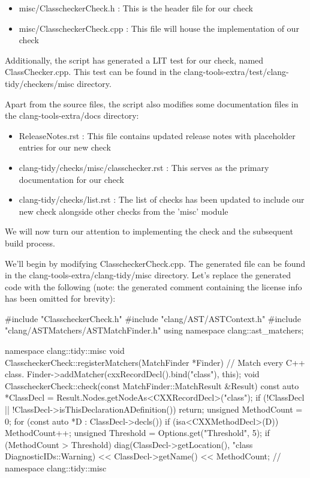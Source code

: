 \begin{itemize}
\item
misc/ClasscheckerCheck.h : This is the header file for our check

\item
misc/ClasscheckerCheck.cpp : This file will house the implementation of our check
\end{itemize}

Additionally, the script has generated a LIT test for our check, named ClassChecker.cpp. This test can be found in the clang-tools-extra/test/clang-tidy/checkers/misc directory.

Apart from the source files, the script also modifies some documentation files in the clang-tools-extra/docs directory:

\begin{itemize}
\item
ReleaseNotes.rst : This file contains updated release notes with placeholder entries for our new check

\item
clang-tidy/checks/misc/classchecker.rst : This serves as the primary documentation for our check

\item
clang-tidy/checks/list.rst : The list of checks has been updated to include our new check alongside other checks from the 'misc' module
\end{itemize}

We will now turn our attention to implementing the check and the subsequent build process.


We'll begin by modifying ClasscheckerCheck.cpp. The generated file can be found in the clang-tools-extra/clang-tidy/misc directory. Let's replace the generated code with the following (note: the generated comment containing the license info has been omitted for brevity):

\begin{cpp}
#include "ClasscheckerCheck.h"
#include "clang/AST/ASTContext.h"
#include "clang/ASTMatchers/ASTMatchFinder.h"
using namespace clang::ast_matchers;

namespace clang::tidy::misc {
void ClasscheckerCheck::registerMatchers(MatchFinder *Finder) {
  // Match every C++ class.
  Finder->addMatcher(cxxRecordDecl().bind("class"), this);
}
void ClasscheckerCheck::check(const MatchFinder::MatchResult &Result) {
   const auto *ClassDecl = Result.Nodes.getNodeAs<CXXRecordDecl>("class");
   if (!ClassDecl || !ClassDecl->isThisDeclarationADefinition())
     return;
   unsigned MethodCount = 0;
   for (const auto *D : ClassDecl->decls()) {
     if (isa<CXXMethodDecl>(D))
       MethodCount++;
   }
   unsigned Threshold = Options.get("Threshold", 5);
   if (MethodCount > Threshold) {
     diag(ClassDecl->getLocation(),
       "class %
       DiagnosticIDs::Warning)
     << ClassDecl->getName() << MethodCount;
   }
  }
} // namespace clang::tidy::misc
\end{cpp}

